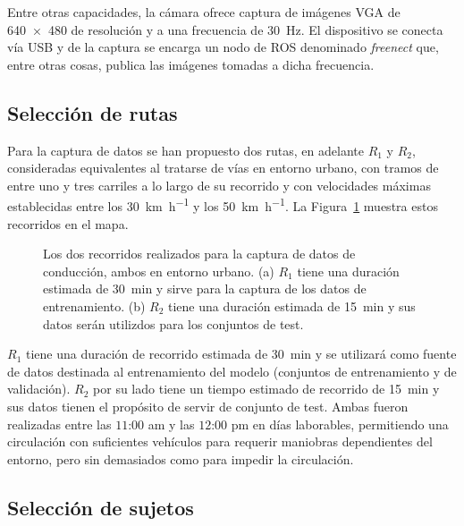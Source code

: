 Entre otras capacidades, la cámara ofrece captura de imágenes VGA de \SI{640x480}{\px} de resolución y a una frecuencia de \SI{30}{\Hz}. El dispositivo se conecta vía USB y de la captura se encarga un nodo de ROS denominado \textit{freenect} 	que, entre otras cosas, publica las imágenes tomadas a dicha frecuencia.

\subsection{Selección de rutas}

Para la captura de datos se han propuesto dos rutas, en adelante $R_1$ y $R_2$, consideradas equivalentes al tratarse de vías en entorno urbano, con tramos de entre uno y tres carriles a lo largo de su recorrido y con velocidades máximas establecidas entre los \SI{30}{\km\per\hour} y los \SI{50}{\km\per\hour}. La Figura~\ref{fig:proposed-routes} muestra estos recorridos en el mapa.

\begin{figure}
	\centering
	\qquad
	\caption[Los dos recorridos planteados para la captura de datos de conducción]{Los dos recorridos realizados para la captura de datos de conducción, ambos en entorno urbano. (a) $R_1$ tiene una duración estimada de \SI{30}{\minute} y sirve para la captura de los datos de entrenamiento. (b) $R_2$ tiene una duración estimada de \SI{15}{\minute} y sus datos serán utilizdos para los conjuntos de test.}
	\label{fig:proposed-routes}
\end{figure}

$R_1$ tiene una duración de recorrido estimada de \SI{30}{\minute} y se utilizará como fuente de datos destinada al entrenamiento del modelo (conjuntos de entrenamiento y de validación). $R_2$ por su lado tiene un tiempo estimado de recorrido de \SI{15}{\minute} y sus datos tienen el propósito de servir de conjunto de test. Ambas fueron realizadas entre las $11$:$00$ am y las $12$:$00$ pm en días laborables, permitiendo una circulación con suficientes vehículos para requerir maniobras dependientes del entorno, pero sin demasiados como para impedir la circulación.

\subsection{Selección de sujetos}

